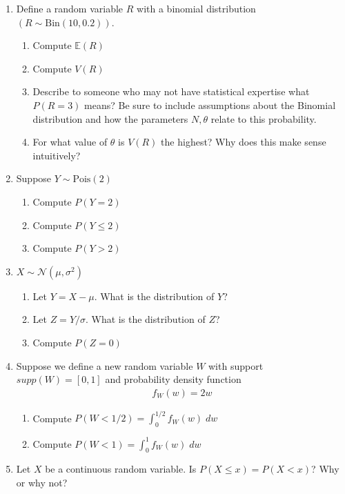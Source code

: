 \begin{enumerate}
    \item Define a random variable $R$ with a binomial distribution $(R \sim \text{Bin}(10,0.2))$.
    \begin{enumerate}
        \item Compute $\mathbb{E}(R)$
        \item Compute $V(R)$
        \item Describe to someone who may not have statistical expertise what $P(R=3)$ means? Be sure to include assumptions about the Binomial distribution and how the parameters $N,\theta$ relate to this probability.
        \item For what value of $\theta$ is $V(R)$ the highest? Why does this make sense intuitively?
    \end{enumerate}
    \item Suppose $Y \sim \text{Pois}(2)$
    \begin{enumerate}
        \item Compute $P(Y=2)$
        \item Compute $P(Y \leq 2)$
        \item Compute $P(Y > 2)$
    \end{enumerate}
    
    \item $X \sim \mathcal{N}(\mu, \sigma^{2}) $
    \begin{enumerate}
        \item Let $Y = X - \mu$. What is the distribution of $Y$?
        \item Let $Z = Y/\sigma$. What is the distribution of $Z$?
        \item Compute $P(Z = 0)$
    \end{enumerate}
    
    \item Suppose we define a new random variable $W$ with support $supp(W) = [0,1]$ and probability density function 
       \begin{align}
          f_{W}(w) = 2w
       \end{align}
      \begin{enumerate}
          \item Compute $P(W < 1/2) = \int_{0}^{1/2} f_{W}(w)\; dw$
          \item Compute $P(W < 1) = \int_{0}^{1} f_{W}(w)\; dw$
      \end{enumerate}
      
    \item Let $X$ be a continuous random variable. Is $P(X \leq x) = P(X < x)$? Why or why not? 

\end{enumerate}


